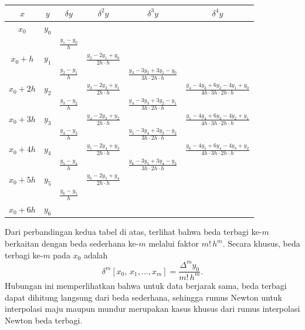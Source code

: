 \begin{table}[!htbp]
\large
\begin{tabular}{@{}|c|c|c|c|c|c|@{}}
\hline
$x$  & $y$  & $\delta y$ & $\delta^2 y$ & $\delta^3 y$ & $\delta^4 y$\\\hline
$x_0$ & $y_0$ & & & &\\
& & $\frac{y_1 - y_0}{h}$ & & &\\
$x_0 + h$ & $y_1$ & & $\frac{y_2 - 2y_1 + y_0}{2h\cdot h}$ & &\\
& & $\frac{y_2 - y_1}{h}$ & & $\frac{y_3 - 3y_2 + 3y_1 - y_0}{3h\cdot2h\cdot h}$ & \\
$x_0 + 2h$ & $y_2$ & & $\frac{y_3 - 2y_2 + y_1}{2h\cdot h}$ & & $\frac{y_4 - 4y_3 + 6y_2 - 4y_1 + y_0}{4h\cdot3h\cdot2h\cdot h}$ \\
& & $\frac{y_3 - y_2}{h}$ & & $\frac{y_4 - 3y_3 + 3y_2 - y_1}{3h\cdot2h\cdot h}$ & \\
$x_0 + 3h$ & $y_3$ & & $\frac{y_4 - 2y_3 + y_2}{2h\cdot h}$ & & $\frac{y_5 - 4y_4 + 6y_3 - 4y_2 + y_1}{4h\cdot3h\cdot2h\cdot h}$ \\
& & $\frac{y_4 - y_3}{h}$ & & $\frac{y_5 - 3y_4 + 3y_3 - y_2}{3h\cdot2h\cdot h}$ & \\
$x_0 + 4h$ & $y_4$ & & $\frac{y_5 - 2y_4 + y_3}{2h\cdot h}$ & & $\frac{y_6 - 4y_5 + 6y_4 - 4y_3 + y_2}{4h\cdot3h\cdot2h\cdot h}$ \\
& & $\frac{y_5 - y_4}{h}$ & & $\frac{y_6 - 3y_5 + 3y_4 - y_3}{3h\cdot2h\cdot h}$ & \\
$x_0 + 5h$ & $y_5$ & & $\frac{y_6 - 2y_5 + y_4}{2h\cdot h}$ & & \\
& & $\frac{y_6 - y_5}{h}$ & & & \\
$x_0 + 6h$ & $y_6$ & & & & \\\hline
\end{tabular}
\end{table}




Dari perbandingan kedua tabel di atas, terlihat bahwa beda terbagi ke-$m$ berkaitan dengan beda sederhana ke-$m$ melalui faktor $m!\,h^m$. Secara khusus, beda terbagi ke-$m$ pada $x_0$ adalah
\begin{equation}
\delta^m[x_0,\,x_1,\ldots,x_m] = \frac{\Delta^m y_0}{m!\,h^m}.
\end{equation}
Hubungan ini memperlihatkan bahwa untuk data berjarak sama, beda terbagi dapat dihitung langsung dari beda sederhana, sehingga rumus Newton untuk interpolasi maju maupun mundur merupakan kasus khusus dari rumus interpolasi Newton beda terbagi.


